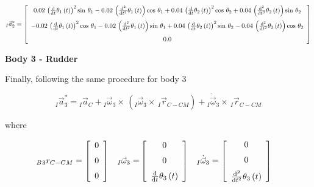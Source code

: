 \begin{equation}\label{aavectorbody2}\scalemath{0.9}{
	_I\vec{a}_{2}^* =  \left[ \begin {array}{c}  0.02\, \left( {\frac {\rm d}{{\rm d}t}}
\theta_{{1}} \left( t \right)  \right) ^{2}\sin\,\theta_{1}- 0.02\,
 \left( {\frac {{\rm d}^{2}}{{\rm d}{t}^{2}}}\theta_{{1}} \left( t
 \right)  \right) \cos\,\theta_{1}+ 0.04\, \left( {\frac {\rm d}{
{\rm d}t}}\theta_{{2}} \left( t \right)  \right) ^{2}\cos\,\theta_{2}+
 0.04\, \left( {\frac {{\rm d}^{2}}{{\rm d}{t}^{2}}}\theta_{{2}}
 \left( t \right)  \right) \sin\,\theta_{2}\\ \noalign{\medskip}- 0.02
\, \left( {\frac {\rm d}{{\rm d}t}}\theta_{{1}} \left( t \right) 
 \right) ^{2}\cos\,\theta_{1}- 0.02\, \left( {\frac {{\rm d}^{2}}{
{\rm d}{t}^{2}}}\theta_{{1}} \left( t \right)  \right) \sin\,\theta_{1
}+ 0.04\, \left( {\frac {\rm d}{{\rm d}t}}\theta_{{2}} \left( t
 \right)  \right) ^{2}\sin\,\theta_{2}- 0.04\, \left( {\frac {{\rm d}^
{2}}{{\rm d}{t}^{2}}}\theta_{{2}} \left( t \right)  \right) \cos\,
\theta_{2}\\ \noalign{\medskip} 0.0\end {array} \right] 
}
\end{equation}


\textbf{Body 3 - Rudder}

Finally, following the same procedure for body 3

\begin{equation}\label{aabody3}
_I\vec{a}_{3}^* = {_I}\vec{a}_{C}+ {_I}\vec{\omega}_{3}\times \,({_I}\vec{\omega}_{3}\times \,{_I}\vec{r}_{C-CM}) + {_I}\dot{\vec{\omega}}_{3}\times \,{_I}\vec{r}_{C-CM}
\end{equation}

where 

\begin{align*}
_B{_3}{r}_{C-CM} &= \left[ \begin {array}{c} 0\\ \noalign{\medskip}0\\ \noalign{\medskip}0
\end {array} \right]&
{_I}\vec{\omega}_{3} =&   \left[ \begin {array}{c} 0\\ \noalign{\medskip}0\\ \noalign{\medskip}
{\frac {\rm d}{{\rm d}t}}\theta_{{3}} \left( t \right) \end {array}
 \right]&
{_I}\dot{\vec{\omega}}_{3} &= \left[ \begin {array}{c} 0\\ \noalign{\medskip}0\\ \noalign{\medskip}
{\frac {{\rm d}^{2}}{{\rm d}{t}^{2}}}\theta_{{3}} \left( t \right) 
\end {array} \right]&
\end{align*}


